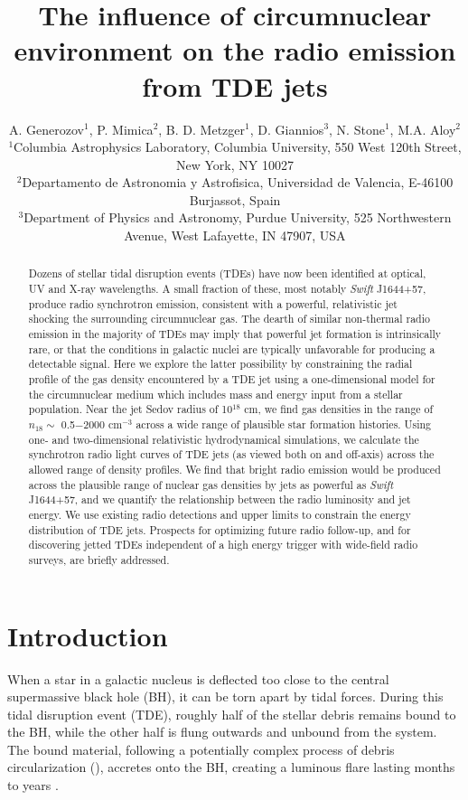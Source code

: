 \documentclass[usenatbib,fleqn]{mnras}
\title[Influence of CNM on TDE radio emission]{The influence of
  circumnuclear environment on the radio emission from TDE jets}
\author[Generozov et al.]{ A. Generozov$^{1}$, P. Mimica$^{2}$,
  B. D. Metzger$^{1}$, D. Giannios$^{3}$, N. Stone$^{1}$,
  M.A. Aloy$^{2}$
  \\
  $^{1}$Columbia Astrophysics Laboratory, Columbia University, 550 West 120th Street, New York, NY 10027\\
  $^{2}$Departamento de Astronomia y Astrofisica, Universidad de Valencia, E-46100 Burjassot, Spain\\
  $^{3}$Department of Physics and Astronomy, Purdue University, 525
  Northwestern Avenue, West Lafayette, IN 47907, USA}
\begin{document}
\maketitle
\begin{abstract}
  Dozens of stellar tidal disruption events (TDEs) have now been
  identified at optical, UV and X-ray wavelengths.  A small fraction
  of these, most notably {\it Swift} J1644+57, produce radio
  synchrotron emission, consistent with a powerful, relativistic jet
  shocking the surrounding circumnuclear gas.  The dearth of similar
  non-thermal radio emission in the majority of TDEs may imply that
  powerful jet formation is intrinsically rare, or that the conditions
  in galactic nuclei are typically unfavorable for producing a
  detectable signal.  Here we explore the latter possibility by
  constraining the radial profile of the gas density encountered by a
  TDE jet using a one-dimensional model for the circumnuclear medium
  which includes mass and energy input from a stellar population.
  Near the jet Sedov radius of 10$^{18}$ cm, we find gas densities in
  the range of $n_{18} \sim$ 0.5$-$2000 cm$^{-3}$ across a wide range
  of plausible star formation histories.  Using one- and
  two-dimensional relativistic hydrodynamical simulations, we
  calculate the synchrotron radio light curves of TDE jets (as viewed
  both on and off-axis) across the allowed range of density profiles.
  We find that bright radio emission would be produced across the
  plausible range of nuclear gas densities by jets as powerful as {\it
    Swift} J1644+57, and we quantify the relationship between the
  radio luminosity and jet energy.  We use existing radio detections
  and upper limits to constrain the energy distribution of TDE jets.
  Prospects for optimizing future radio follow-up, and for discovering
  jetted TDEs independent of a high energy trigger with wide-field
  radio surveys, are briefly addressed.
\end{abstract}
\section{Introduction}
\label{sec:intro}
When a star in a galactic nucleus is deflected too close to the
central supermassive black hole (BH), it can be torn apart by tidal
forces.  During this tidal disruption event (TDE), roughly half of the
stellar debris remains bound to the BH, while the other half is flung
outwards and unbound from the system.  The bound material, following a
potentially complex process of debris circularization
(\citealt{Kochanek1994,Guillochon+2013,Hayasaki+2013,Hayasaki+2015,Shiokawa+2015,Bonnerot+2015}),
accretes onto the BH, creating a luminous flare lasting months to
years \citep{Hills1975, Carter+1982, Rees1988}.
\end{document}
